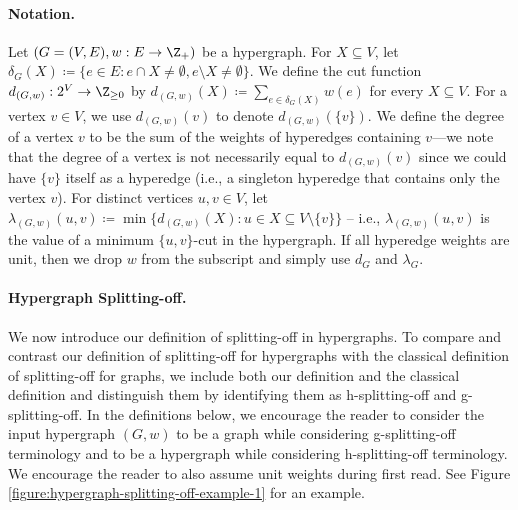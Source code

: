 \paragraph{Notation.} Let $(G=(V, E), w: E\rightarrow \Z_+)$ be a hypergraph. 
For $X\subseteq V$, let $\delta_G(X)\coloneqq \{e\in E: e\cap X\neq \emptyset, e\setminus X\neq \emptyset\}$.  
We define the cut function $d_{(G, w)}: 2^V\rightarrow \Z_{\ge 0}$ by $d_{(G, w)}(X) \coloneqq \sum_{e\in \delta_G(X)}w(e)$ for every $X\subseteq V$. 
For a vertex $v\in V$, we use $d_{(G,w)}(v)$ to denote $d_{(G,w)}(\{v\})$. 
We define the degree of a vertex $v$ to be the sum of the weights of hyperedges containing $v$---we note that the degree of a vertex is not necessarily equal to $d_{(G, w)}(v)$ since we could have $\{v\}$ itself as a hyperedge (i.e., a singleton hyperedge that contains only the vertex $v$). 
For distinct vertices $u, v\in V$, let $\lambda_{(G, w)}(u, v)\coloneqq \min\{d_{(G, w)}(X): u\in X\subseteq V\setminus \{v\}\}$ -- i.e., $\lambda_{(G, w)}(u, v)$ is the value of a minimum $\{u, v\}$-cut in the hypergraph. If all hyperedge weights are unit, then we drop $w$ from the subscript and simply use $d_G$ and $\lambda_G$. 

\paragraph{Hypergraph Splitting-off.} 
We now introduce our definition of splitting-off in hypergraphs. 
To compare and contrast our definition of splitting-off for hypergraphs with the classical definition of splitting-off for graphs, we include both our definition and the classical definition and distinguish them by identifying them as h-splitting-off and g-splitting-off. 
In the definitions below, we encourage the reader to consider the input hypergraph $(G, w)$ to be a graph while considering g-splitting-off terminology and to be a hypergraph while considering h-splitting-off terminology. We encourage the reader to also assume unit weights during first read. See Figure \ref{figure:hypergraph-splitting-off-example-1} for an example. 

